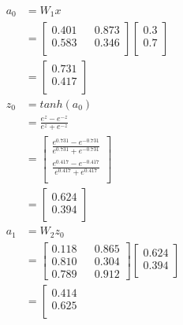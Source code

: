 \documentclass[a4paper]{article}
\begin{document}
\begin{align*}
    a_{0} &= W_{1}x \\
    &= \left[\begin{matrix}     
        0.401 && 0.873 \\
        0.583 && 0.346 \\
       \end{matrix} \right] 
       \left[\begin{matrix}
        0.3  \\
        0.7 \\
       \end{matrix} \right] \\
    &= \left[\begin{matrix}
        0.731 \\
        0.417 \\
       \end{matrix} \right] \\
    z_{0} &= tanh(a_{0}) \\
    &= \frac{e^{z} - e^{-z}}{e^{z} + e^{-z}} \\
    &= \left[\begin{matrix}
        \frac{e^{0.731} - e^{-0.731}}{e^{0.731} + e^{-0.731}}  \\
        \frac{e^{0.417} - e^{-0.417}}{e^{0.417} + e^{0.417}} \\
       \end{matrix} \right] \\
    &= \left[\begin{matrix}
        0.624  \\
        0.394  \\
       \end{matrix} \right] \\
    a_{1} &= W_{2}z_{0} \\
    &= \left[\begin{matrix}     
        0.118 && 0.865 \\
        0.810 && 0.304 \\
        0.789 && 0.912
       \end{matrix} \right] 
       \left[\begin{matrix}
        0.624  \\
        0.394  \\
       \end{matrix} \right] \\
    &= \left[\begin{matrix}
        0.414 \\
        0.625 \\

\end{matrix}
\end{align*}
\end{document}
